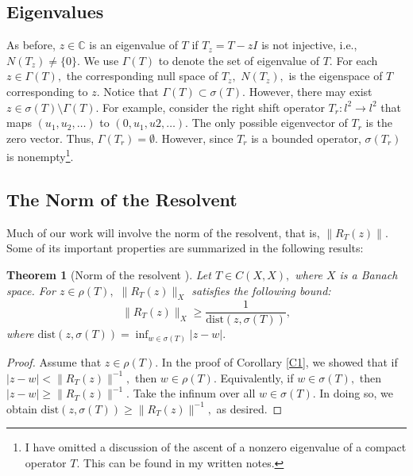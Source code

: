 \documentclass[12pt,a4paper]{article}
\theoremstyle{boldthm}
\newtheorem{theorem}{Theorem}[section]
\theoremstyle{bolddefn}
\begin{document}
\subsection{Eigenvalues}

As before, $z \in \mathbb{C}$ is an eigenvalue of $T$ if $T_z = T - zI$ is not injective, i.e., $N(T_z) \ne \{0\}.$ We use $\Gamma(T)$ to denote the set of eigenvalue of $T.$ For each $z \in \Gamma(T),$ the corresponding null space of $T_z,$ $N(T_z),$ is the eigenspace of $T$ corresponding to $z.$ Notice that $\Gamma(T)\subset \sigma(T).$ However, there may exist $z \in \sigma(T) \setminus \Gamma(T).$ For example, consider the right shift operator $T_r : l^2 \rightarrow l^2$ that maps $(u_1, u_2, \dots)$ to $(0, u_1, u2, \dots).$ The only possible eigenvector of $T_r$ is the zero vector. Thus, $\Gamma(T_r) = \emptyset.$ However, since $T_r$ is a bounded operator, $\sigma(T_r)$ is nonempty\footnote{I have omitted a discussion of the ascent of a nonzero eigenvalue of a compact operator $T.$ This can be found in my written notes.}.

\subsection{The Norm of the Resolvent}

Much of our work will involve the norm of the resolvent, that is, $\| R_T(z) \|.$ Some of its important properties are summarized in the following results:

\begin{theorem}[Norm of the resolvent \cite{Nick}]  Let $T \in C(X, X),$ where $X$ is a Banach space. For $z \in \rho(T),$ $\| R_T(z) \|_X$ satisfies the following bound:
    \begin{equation}
        \| R_T(z) \|_X \ge \frac{1}{\text{dist}(z, \sigma(T))},
    \end{equation}
    where $\text{dist}(z, \sigma(T)) = \inf_{w \in \sigma(T)} | z - w |.$
\end{theorem}

\begin{proof}
    Assume that $z \in \rho(T).$ In the proof of Corollary \ref{C1}, we showed that if $|z - w|< \|R_T(z)\|^{-1},$ then $w\in \rho(T).$ Equivalently, if $w \in \sigma(T),$ then $|z - w| \ge \| R_T(z) \|^{-1}.$ Take the infinum over all $w \in \sigma(T).$ In doing so, we obtain $\text{dist}(z, \sigma(T)) \ge \| R_T(z) \|^{-1},$ as desired.
\end{proof}
\end{document}
